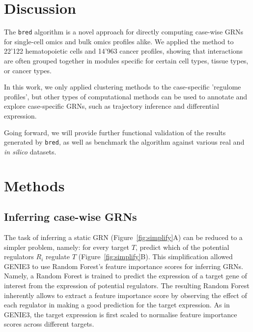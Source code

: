 \section{Discussion}

The \texttt{bred} algorithm is a novel approach for directly computing case-wise GRNs for single-cell omics and bulk omics profiles alike. We applied the method to 22'122 hematopoietic cells and 14'963 cancer profiles, showing that interactions are often grouped together in modules specific for certain cell types, tissue types, or cancer types. 

In this work, we only applied clustering methods to the case-specific 'regulome profiles', but other types of computational methods can be used to annotate and explore case-specific GRNs, such as trajectory inference and differential expression.

Going forward, we will provide further functional validation of the results generated by \texttt{bred}, as well as benchmark the algorithm against various real and \textit{in silico} datasets.


\section{Methods}

\subsection{Inferring case-wise GRNs}
The task of inferring a static GRN (Figure~\ref{fig:simplify}A) can be reduced to a simpler problem, namely: for every target $T$, predict which of the potential regulators $R_i$ regulate $T$ (Figure~\ref{fig:simplify}B). This simplification allowed GENIE3\cite{huynh-thu_inferringregulatorynetworks_2010} to use Random Forest's\cite{breiman_randomforests_2001} feature importance scores for inferring GRNs. Namely, a Random Forest is trained to predict the expression of a target gene of interest from the expression of potential regulators. The resulting Random Forest inherently allows to extract a feature importance score by observing the effect of each regulator in making a good prediction for the target expression. As in GENIE3, the target expression is first scaled to normalise feature importance scores across different targets.

